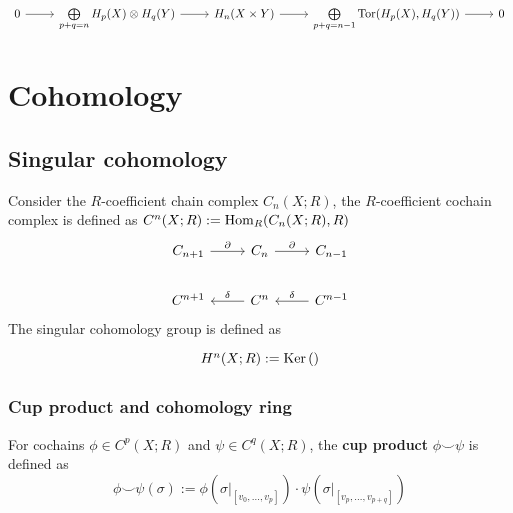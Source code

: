 \documentclass[12pt, oneside]{book}
\begin{document}
\begin{theorem}
    \begin{equation*}
        \begin{tikzcd}
            0 \arrow[r] & \bigoplus\limits_{p+q=n} H_p(X)\otimes H_q(Y) \arrow[r] & H_n(X\times Y) \arrow[r] & \bigoplus\limits_{p+q=n-1} \Tor(H_p(X),H_q(Y)) \arrow[r] & 0
        \end{tikzcd}
    \end{equation*}
\end{theorem}



\chapter{Cohomology}
\section{Singular cohomology}
\begin{definition}
    Consider the $R$-coefficient chain complex $C_n(X;R)$, the $R$-coefficient cochain complex is defined as
    $C^n(X;R) := \operatorname{\operatorname{Hom}}_R(C_n(X;R),R)$
    \begin{equation*}
        \begin{tikzcd}
            C_{n+1}\arrow[r,"\partial"] &  C_{n}\arrow[r,"\partial"]  &  C_{n-1} \\
            C^{n+1}  &   \arrow[l,"\delta"']   C^{n}&\arrow[l,"\delta"']   C^{n-1}
        \end{tikzcd}
    \end{equation*}
    The singular cohomology group is defined as
    \begin{equation*}
        \begin{tikzcd}
            H^n(X;R) := \Ker\left(  \right)
        \end{tikzcd}
    \end{equation*}
\end{definition}

\begin{theorem}

\end{theorem}
\subsection{Cup product and cohomology ring}


\begin{definition}
    For cochains $\phi \in C^p(X;R)$ and $\psi \in C^q(X;R)$, the \textbf{cup product} $\phi \smile \psi$ is defined as
    \begin{equation*}
        \phi \smile \psi (\sigma) := \phi(\sigma|_{[v_0,\ldots,v_p]}) \cdot \psi(\sigma|_{[v_p,\ldots,v_{p+q}]})
    \end{equation*}
\end{definition}
\end{document}
